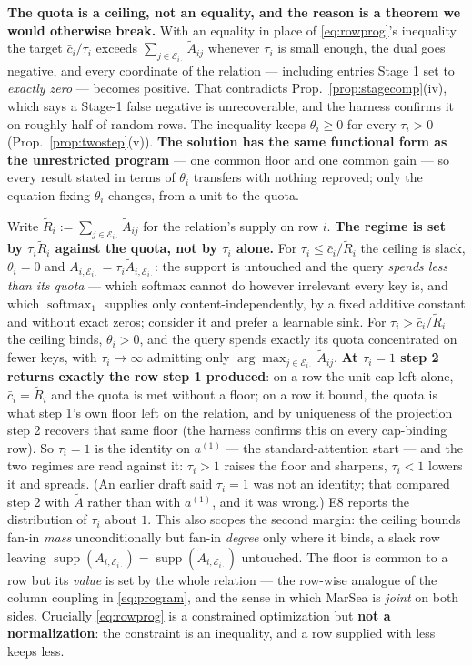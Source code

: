 \documentclass{article}
\newcommand{\softmaxop}{\operatorname{softmax}}
\newcommand{\supp}{\operatorname{supp}}
\begin{document}
\textbf{The quota is a ceiling, not an equality, and the reason is a theorem we would otherwise
break.} With an equality in place of \eqref{eq:rowprog}'s inequality the target
$\bar c_i/\tau_i$ exceeds $\sum_{j\in\mathcal{E}_{i\cdot}}\tilde A_{ij}$ whenever $\tau_i$ is small
enough, the dual goes negative, and every coordinate of the relation --- including entries Stage
1 set to \emph{exactly zero} --- becomes positive. That contradicts
Prop.~\ref{prop:stagecomp}(iv), which says a Stage-1 false negative is unrecoverable, and the
harness confirms it on roughly half of random rows. The inequality keeps $\theta_i\ge0$ for every
$\tau_i>0$ (Prop.~\ref{prop:twostep}(v)). \textbf{The solution has the same functional form as
the unrestricted program} --- one common floor and one common gain --- so every result stated in
terms of $\theta_i$ transfers with nothing reproved; only the equation fixing $\theta_i$ changes,
from a unit to the quota.

Write $\tilde R_i:=\sum_{j\in\mathcal{E}_{i\cdot}}\tilde A_{ij}$ for the relation's supply on
row $i$. \textbf{The regime is set by $\tau_i\tilde R_i$ against the quota, not by $\tau_i$
alone.} For $\tau_i\le \bar c_i/\tilde R_i$ the ceiling is slack, $\theta_i=0$ and
$A_{i,\mathcal{E}_{i\cdot}}=\tau_i\tilde A_{i,\mathcal{E}_{i\cdot}}$: the support is untouched
and the query \emph{spends less than its quota} --- which softmax cannot do however irrelevant
every key is, and which $\softmaxop_1$ \citep{miller2023attention} supplies only
content-independently, by a fixed additive constant and without exact zeros;
\citet{xiao2024efficient} consider it and prefer a learnable sink. For $\tau_i>\bar c_i/\tilde R_i$
the ceiling binds, $\theta_i>0$, and the query spends exactly its quota concentrated on fewer
keys, with $\tau_i\to\infty$ admitting only $\arg\max_{j\in\mathcal{E}_{i\cdot}}\tilde A_{ij}$.
\textbf{At $\tau_i=1$ step 2 returns exactly the row step 1 produced}: on a row the unit cap
left alone, $\bar c_i=\tilde R_i$ and the quota is met without a floor; on a row it bound, the
quota is what step 1's own floor left on the relation, and by uniqueness of the projection step 2
recovers that same floor (the harness confirms this on every cap-binding row). So $\tau_i=1$ is
the identity on $a^{(1)}$ --- the standard-attention start --- and the two regimes are read
against it: $\tau_i>1$ raises the floor and sharpens, $\tau_i<1$ lowers it and spreads. (An
earlier draft said $\tau_i=1$ was not an identity; that compared step 2 with $\tilde A$ rather
than with $a^{(1)}$, and it was wrong.) E8 reports the distribution of $\tau_i$ about $1$. This also scopes the second margin: the ceiling bounds fan-in
\emph{mass} unconditionally but fan-in \emph{degree} only where it binds, a slack row leaving
$\supp(A_{i,\mathcal{E}_{i\cdot}})=\supp(\tilde A_{i,\mathcal{E}_{i\cdot}})$ untouched. The
floor is common to a row but its \emph{value} is set by the whole relation --- the row-wise
analogue of the column coupling in \eqref{eq:program}, and the sense in which MarSea is
\emph{joint} on both sides. Crucially \eqref{eq:rowprog} is a constrained optimization but
\textbf{not a normalization}: the constraint is an inequality, and a row supplied with less
keeps less.
\end{document}
